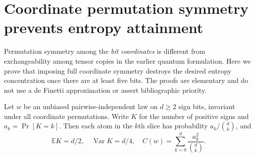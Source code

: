 \documentclass[11pt]{article}
\begin{document}
\section{Coordinate permutation symmetry prevents entropy attainment}
\label{sec:coordinate-symmetry}
Permutation symmetry among the \emph{bit coordinates} is different
from exchangeability among tensor copies in the earlier quantum
formulation. Here we prove that imposing full coordinate symmetry
destroys the desired entropy concentration once there are at least
five bits. The proofs are elementary and do not use a de Finetti
approximation or assert bibliographic priority.

Let $w$ be an unbiased pairwise-independent law on $d\ge2$ sign bits,
invariant under all coordinate permutations. Write $K$ for the number
of positive signs and $a_k=\Pr[K=k]$. Then each atom in the $k$th
slice has probability $a_k/\binom dk$, and
\[
 \mathbb E K=d/2,\quad \operatorname{Var}K=d/4,\quad
 C(w)=\sum_{k=0}^d\frac{a_k^2}{\binom dk}.
\]
\end{document}
